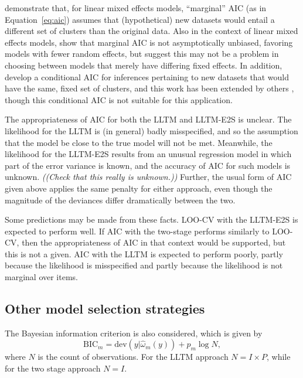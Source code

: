 \textcite{Vaida2005} demonstrate that, for linear mixed effects models, ``marginal'' AIC (as in Equation~\ref{eq:aic}) assumes that (hypothetical) new datasets would entail a different set of clusters than the original data. Also in the context of linear mixed effects models, \textcite{Greven2010} show that marginal AIC is not asymptotically unbiased, favoring models with fewer random effects, but suggest this may not be a problem in choosing between models that merely have differing fixed effects. In addition, \textcite{Vaida2005} develop a conditional AIC for inferences pertaining to new datasets that would have the same, fixed set of clusters, and this work has been extended by others \parencite{Liang2008, Greven2010, yu2012conditional, yu2013information, saefken2014unifying}, though this conditional AIC is not suitable for this application.

The appropriateness of AIC for both the LLTM and LLTM-E2S is unclear. The likelihood for the LLTM is (in general) badly misspecified, and so the assumption that the model be close to the true model will not be met. Meanwhile, the likelihood for the LLTM-E2S results from an unusual regression model in which part of the error variance is known, and the accuracy of AIC for such models is unknown. \emph{((Check that this really is unknown.))} Further, the usual form of AIC given above applies the same penalty for either approach, even though the magnitude of the deviances differ dramatically between the two.

Some predictions may be made from these facts. LOO-CV with the LLTM-E2S is expected to perform well. If AIC with the two-stage performs similarly to LOO-CV, then the appropriateness of AIC in that context would be supported, but this is not a given. AIC with the LLTM is expected to perform poorly, partly because the likelihood is misspecified and partly because the likelihood is not marginal over items.


\subsection{Other model selection strategies}

The Bayesian information criterion \parencite[BIC;][]{schwarz1978estimating} is also considered, which is given by
\begin{equation}
	\mathrm{BIC}_m = \mathrm{dev}(y | \hat \omega_m(y)) + p_m \log N
,\end{equation}
where $N$ is the count of observations. For the LLTM approach $N = I \times P$, while for the two stage approach $N = I$.

